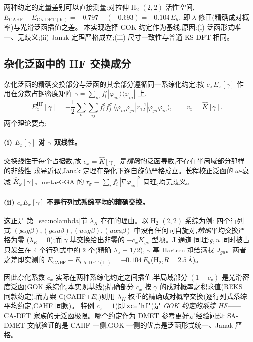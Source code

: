 \documentclass[11pt,a4paper]{ctexart}
\begin{document}
两种约定的定量差别可以直接测量:对拉伸 H$_2$ $(2,2)$ 活性空间,
$E_{\mathrm{CAHF}} - E_{\mathrm{CA\text{-}DFT}(\mathrm{hf})}
 = -0.797 - (-0.693) = -0.104\,E_h$,
即 $\lambda$ 修正(精确成对概率)与光滑泛函插值之差。
本实现选择 GOK 约定作为基线,原因:(i) 泛函形式唯一、无歧义;(ii) Janak
定理严格成立;(iii) 尺寸一致性与普通 KS-DFT 相同。

\subsection{杂化泛函中的 HF 交换成分}

杂化泛函的精确交换部分与泛函的其余部分遵循同一系综化约定:按
$c_x\,E_x[\gamma]$ 作用在分数占据密度矩阵
$\gamma=\sum_{i\sigma}f_i^\sigma|\varphi_{i\sigma}\rangle
\langle\varphi_{i\sigma}|$ 上,
\begin{equation}
  E_x^{\mathrm{HF}}[\gamma]
  = -\frac12\sum_\sigma\sum_{ij}
    f_i^\sigma f_j^\sigma\,
    \langle \varphi_{i\sigma}\varphi_{j\sigma}
    | r_{12}^{-1} | \varphi_{j\sigma}\varphi_{i\sigma}\rangle ,
  \qquad v_x = \hat K[\gamma] .
\end{equation}
两个理论要点:

\paragraph{(i) $E_x[\gamma]$ 对 $\gamma$ 双线性。}交换线性于每个占据数,故
$v_x=\hat K[\gamma]$ 是\emph{精确}的泛函导数,不存在半局域部分那样的非线性
求导近似,Janak 定理在杂化下逐自旋仍严格成立。长程校正泛函的
$\omega$-衰减 $\hat K_\omega[\gamma]$、meta-GGA 的
$\tau_\sigma=\sum_i f_i^\sigma|\nabla\varphi_{i\sigma}|^2$ 同理,均无歧义。

\paragraph{(ii) $c_xE_x[\gamma]$ 不是行列式系综平均的精确交换。}这正是
第~\ref{sec:nolambda}节 $\lambda_K$ 存在的理由。以 H$_2$ $(2,2)$ 系综为例:
四个行列式 $(g\alpha g\beta),(g\alpha u\beta),(u\alpha g\beta),
(u\alpha u\beta)$ 中没有任何同自旋对,\emph{精确}平均交换严格为零
($\lambda_K=0$);而 $\gamma$ 基交换给出非零的 $-c_x K_{gu}$ 型项。J 通道
同理:$g,u$ 同时被占只发生在 4 个行列式中的 2 个(精确 $\lambda_J=1/2$),
$\gamma$ 基 Hartree 却给满权 $J_{gu}$。两者之差即实测的
$E_{\mathrm{CAHF}}-E_{\mathrm{CA\text{-}DFT}(\mathrm{hf})}
 = -0.104\,E_h$(H$_2$,$R=2.5$\,\AA{})。

因此杂化系数 $c_x$ 实际在两种系综化约定之间插值:半局域部分
$(1-c_x)$ 是光滑密度泛函(GOK 系综化,本实现基线);精确部分 $c_x$ 按
$\gamma$ 的成对概率之积求值(REKS 同款约定);而方案 C(CAHF$+E_c$)则用
$\lambda_K$ 权重的精确成对概率交换(逐行列式系综平均约定,CAHF 同款)。
特例 $c_x=1$(即 \texttt{xc='hf'})是 \emph{GOK 约定的系综
HF}——CA-DFT 家族的无泛函极限。哪个约定作为 DMET 参考更好是经验问题:
SA-DMET 文献验证的是 CAHF 一侧;GOK 一侧的优点是泛函形式统一、Janak 严格。
\end{document}
